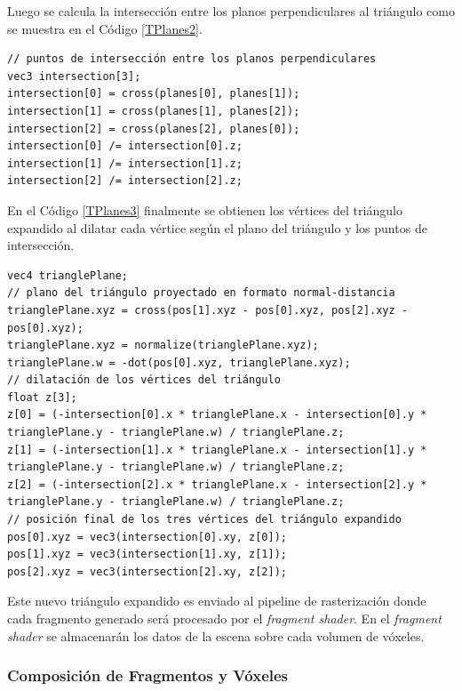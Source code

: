 Luego se calcula la intersección entre los planos perpendiculares al triángulo como se muestra en el Código \ref{TPlanes2}.
\\
\begin{lstlisting}[caption={Intersección entre planos perpendiculares al triángulo proyectado.}, label=TPlanes2]
// puntos de intersección entre los planos perpendiculares
vec3 intersection[3];
intersection[0] = cross(planes[0], planes[1]);
intersection[1] = cross(planes[1], planes[2]);
intersection[2] = cross(planes[2], planes[0]);
intersection[0] /= intersection[0].z;
intersection[1] /= intersection[1].z;
intersection[2] /= intersection[2].z;
\end{lstlisting}

En el Código \ref{TPlanes3} finalmente se obtienen los vértices del triángulo expandido al dilatar cada vértice según el plano del triángulo y los puntos de intersección.
\\
\begin{lstlisting}[caption={Vértices del triángulo expandido.}, label=TPlanes3]
vec4 trianglePlane;
// plano del triángulo proyectado en formato normal-distancia
trianglePlane.xyz = cross(pos[1].xyz - pos[0].xyz, pos[2].xyz - pos[0].xyz);
trianglePlane.xyz = normalize(trianglePlane.xyz);
trianglePlane.w = -dot(pos[0].xyz, trianglePlane.xyz);
// dilatación de los vértices del triángulo
float z[3];
z[0] = (-intersection[0].x * trianglePlane.x - intersection[0].y * trianglePlane.y - trianglePlane.w) / trianglePlane.z;
z[1] = (-intersection[1].x * trianglePlane.x - intersection[1].y * trianglePlane.y - trianglePlane.w) / trianglePlane.z;
z[2] = (-intersection[2].x * trianglePlane.x - intersection[2].y * trianglePlane.y - trianglePlane.w) / trianglePlane.z;
// posición final de los tres vértices del triángulo expandido
pos[0].xyz = vec3(intersection[0].xy, z[0]);
pos[1].xyz = vec3(intersection[1].xy, z[1]);
pos[2].xyz = vec3(intersection[2].xy, z[2]);
\end{lstlisting}

Este nuevo triángulo expandido es enviado al pipeline de rasterización donde cada fragmento generado será procesado por el \emph{fragment shader}. En el \emph{fragment shader} se almacenarán los datos de la escena sobre cada volumen de vóxeles.

\subsubsection{Composición de Fragmentos y Vóxeles}

